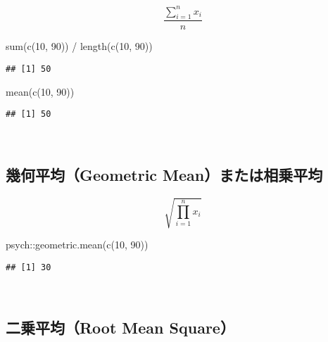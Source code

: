 \documentclass[
  12pt,
]{book}
\newenvironment{Shaded}{\begin{snugshade}}{\end{snugshade}}
\newcommand{\DecValTok}[1]{\textcolor[rgb]{0.00,0.00,0.81}{#1}}
\newcommand{\FunctionTok}[1]{\textcolor[rgb]{0.00,0.00,0.00}{#1}}
\newcommand{\NormalTok}[1]{#1}
\newcommand{\SpecialCharTok}[1]{\textcolor[rgb]{0.00,0.00,0.00}{#1}}
\begin{document}
\[\frac{\sum_{i=1}^n{x_i}}{n}\]

\begin{Shaded}
\begin{Highlighting}[]
\FunctionTok{sum}\NormalTok{(}\FunctionTok{c}\NormalTok{(}\DecValTok{10}\NormalTok{, }\DecValTok{90}\NormalTok{)) }\SpecialCharTok{/} \FunctionTok{length}\NormalTok{(}\FunctionTok{c}\NormalTok{(}\DecValTok{10}\NormalTok{, }\DecValTok{90}\NormalTok{))}
\end{Highlighting}
\end{Shaded}

\begin{verbatim}
## [1] 50
\end{verbatim}

\begin{Shaded}
\begin{Highlighting}[]
\FunctionTok{mean}\NormalTok{(}\FunctionTok{c}\NormalTok{(}\DecValTok{10}\NormalTok{, }\DecValTok{90}\NormalTok{))}
\end{Highlighting}
\end{Shaded}

\begin{verbatim}
## [1] 50
\end{verbatim}

　

\hypertarget{ux5e7eux4f55ux5e73ux5747geometric-meanux307eux305fux306fux76f8ux4e57ux5e73ux5747}{%
\subsection*{幾何平均（Geometric Mean）または相乗平均}\label{ux5e7eux4f55ux5e73ux5747geometric-meanux307eux305fux306fux76f8ux4e57ux5e73ux5747}}

\[\sqrt{\prod_{i=1}^n{x_i}}\]

\begin{Shaded}
\begin{Highlighting}[]
\NormalTok{psych}\SpecialCharTok{::}\FunctionTok{geometric.mean}\NormalTok{(}\FunctionTok{c}\NormalTok{(}\DecValTok{10}\NormalTok{, }\DecValTok{90}\NormalTok{))}
\end{Highlighting}
\end{Shaded}

\begin{verbatim}
## [1] 30
\end{verbatim}

　

\hypertarget{ux4e8cux4e57ux5e73ux5747root-mean-square}{%
\subsection*{二乗平均（Root Mean Square）}\label{ux4e8cux4e57ux5e73ux5747root-mean-square}}
\end{document}
